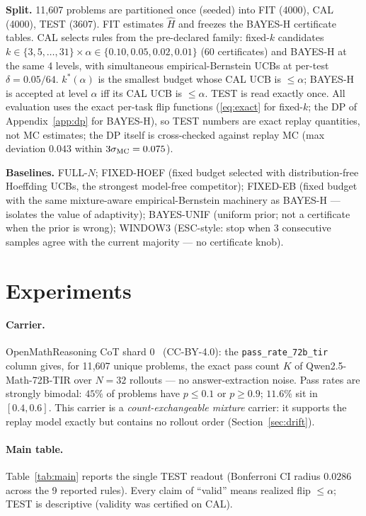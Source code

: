 \documentclass{article}
\theoremstyle{definition}
\theoremstyle{remark}
\begin{document}
\textbf{Split.} 11{,}607 problems are partitioned once (seeded) into FIT
(4000), CAL (4000), TEST (3607). FIT estimates $\widehat H$ and freezes the
BAYES-H certificate tables. CAL selects rules from the pre-declared family:
fixed-$k$ candidates $k\in\{3,5,\dots,31\}\times\alpha\in\{0.10,0.05,0.02,
0.01\}$ (60 certificates) and BAYES-H at the same 4 levels, with simultaneous
empirical-Bernstein UCBs at per-test $\delta=0.05/64$. $k^*(\alpha)$ is the
smallest budget whose CAL UCB is $\le\alpha$; BAYES-H is accepted at level
$\alpha$ iff its CAL UCB is $\le\alpha$. TEST is read exactly once. All
evaluation uses the exact per-task flip functions (\eqref{eq:exact} for
fixed-$k$; the DP of Appendix~\ref{app:dp} for BAYES-H), so TEST numbers are
exact replay quantities, not MC estimates; the DP itself is cross-checked
against replay MC (max deviation $0.043$ within $3\sigma_{\rm MC}=0.075$).

\textbf{Baselines.} FULL-$N$; FIXED-HOEF (fixed budget selected with
distribution-free Hoeffding UCBs, the strongest model-free competitor);
FIXED-EB (fixed budget with the same mixture-aware empirical-Bernstein
machinery as BAYES-H --- isolates the value of adaptivity);
BAYES-UNIF (uniform prior; not a certificate when the prior is wrong);
WINDOW3 (ESC-style: stop when 3 consecutive samples agree with the current
majority --- no certificate knob).

\section{Experiments}
\label{sec:experiments}

\paragraph{Carrier.} OpenMathReasoning CoT shard 0~\citep{moshkov2025openmathreasoning} (CC-BY-4.0): the
\texttt{pass\_rate\_72b\_tir} column gives, for 11{,}607 unique problems, the
exact pass count $K$ of Qwen2.5-Math-72B-TIR over $N=32$ rollouts --- no
answer-extraction noise. Pass rates are strongly bimodal: $45\%$ of problems
have $p\le0.1$ or $p\ge0.9$; $11.6\%$ sit in $[0.4,0.6]$. This carrier is a
\emph{count-exchangeable mixture} carrier: it supports the replay model
exactly but contains no rollout order (Section~\ref{sec:drift}).

\paragraph{Main table.} Table~\ref{tab:main} reports the single TEST readout
(Bonferroni CI radius $0.0286$ across the 9 reported rules). Every claim of
``valid'' means realized flip $\le\alpha$; TEST is descriptive (validity was
certified on CAL).
\end{document}
